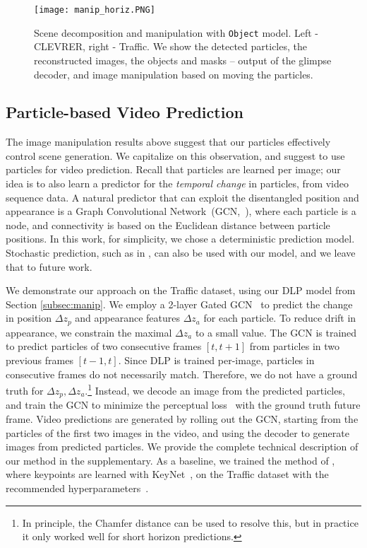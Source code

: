\documentclass[nohyperref]{article}
\theoremstyle{plain}
\theoremstyle{definition}
\theoremstyle{remark}
\begin{document}
\begin{figure*}
     \centering
     \texttt{[image: manip\_horiz.PNG]}
        \caption{Scene decomposition and manipulation with  \texttt{Object} model. Left - CLEVRER, right - Traffic. We show the detected particles, the reconstructed images, the objects and masks -- output of the glimpse decoder, and image manipulation based on moving the particles.}
        \label{fig:obj_manip}
\end{figure*}


\subsection{Particle-based Video Prediction}
\label{sec:video}
The image manipulation results above suggest that our particles effectively control scene generation. We capitalize on this observation, and suggest to use particles for video prediction. Recall that particles are learned per image; our idea is to also learn a predictor for the \textit{temporal change} in particles, from video sequence data. A natural predictor that can exploit the disentangled position and appearance is a Graph Convolutional Network~(GCN,~\citealt{kipf2016gcn}), where each particle is a node, and connectivity is based on the Euclidean distance between particle positions. 
In this work, for simplicity, we chose a deterministic prediction model. Stochastic prediction, such as in \citet{minderer2019unsupervised}, can also be used with our model, and we leave that to future work.



We demonstrate our approach on the Traffic dataset, using our DLP model from Section \ref{subsec:manip}. We employ a 2-layer Gated GCN~\citep{bresson2017gatedgcn}
to predict the change in position $\Delta z_p$ and appearance features $\Delta z_a$ for each particle. To reduce drift in appearance, we constrain the maximal $\Delta z_a$ to a small value. The GCN is trained to predict particles of two consecutive frames $[t,t+1]$ from particles in two previous frames $[t-1,t]$. 
Since DLP is trained per-image, particles in consecutive frames do not necessarily match. Therefore, we do not have a ground truth for $\Delta z_p, \Delta z_a$.\footnote{In principle, the Chamfer distance can be used to resolve this, but in practice it only worked well for short horizon predictions.} Instead, we decode an image from the predicted particles, and train the GCN to minimize the perceptual loss~\citep{hoshen2019non} with the ground truth future frame. Video predictions are generated by rolling out the GCN, starting from the particles of the first two images in the video, and using the decoder to generate images from predicted particles. We provide the complete technical description of our method in the supplementary.
As a baseline, we trained the method of \citet{minderer2019unsupervised}, where keypoints are learned with KeyNet~\citep{jakab2018unsupervised}, on the Traffic dataset with the recommended hyperparameters~\citep{minderer19code}.
\end{document}
